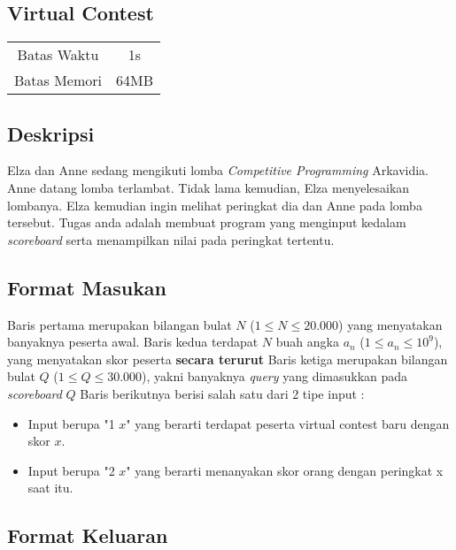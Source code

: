 \documentclass{article}
\begin{document}
\begin{center}
    \section*{Virtual Contest} %

    \begin{tabular}{ | c c | }
        \hline
        Batas Waktu  & 1s \\    %
        Batas Memori & 64MB \\  %
        \hline
    \end{tabular}
\end{center}

\subsection*{Deskripsi}

Elza dan Anne sedang mengikuti lomba \textit{Competitive Programming} Arkavidia. 
Anne datang lomba terlambat. Tidak lama kemudian, Elza menyelesaikan lombanya.
Elza kemudian ingin melihat peringkat dia dan Anne pada lomba tersebut.
Tugas anda adalah membuat program yang menginput kedalam \textit{scoreboard} serta menampilkan nilai pada peringkat tertentu.

\subsection*{Format Masukan}

Baris pertama merupakan bilangan bulat $N$ ($1 \leq N \leq 20.000$) yang menyatakan banyaknya peserta awal.
Baris kedua terdapat $N$ buah angka $a_n$ ($1 \leq a_n \leq 10^9$), yang menyatakan skor peserta \textbf{secara terurut}
Baris ketiga merupakan bilangan bulat $Q$ ($1 \leq Q \leq 30.000$), yakni banyaknya \textit{query} yang dimasukkan pada \textit{scoreboard}
$Q$ Baris berikutnya berisi salah satu dari 2 tipe input :
\begin{itemize}
    \setlength{\itemsep}{0pt}
    \item Input berupa "1 $x$" yang berarti terdapat peserta virtual contest baru dengan skor $x$.
    \item Input berupa "2 $x$" yang berarti menanyakan skor orang dengan peringkat x saat itu.
\end{itemize}

\subsection*{Format Keluaran}
\end{document}
